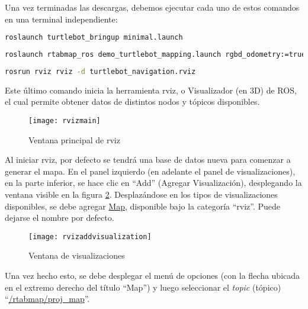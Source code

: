 Una vez terminadas las descargas, debemos ejecutar cada uno de estos comandos en una terminal independiente:

\begin{blackcodebox}
\begin{lstlisting}[language=bash]
roslaunch turtlebot_bringup minimal.launch
\end{lstlisting}
\end{blackcodebox}

\begin{blackcodebox}
\begin{lstlisting}[language=bash]
roslaunch rtabmap_ros demo_turtlebot_mapping.launch rgbd_odometry:=true args:="--delete_db_on_start"
\end{lstlisting}
\end{blackcodebox}

\begin{blackcodebox}
\begin{lstlisting}[language=bash]
rosrun rviz rviz -d turtlebot_navigation.rviz
\end{lstlisting}
\end{blackcodebox}

Este último comando inicia la herramienta rviz, o Visualizador (en 3D) de ROS, el cual permite obtener datos de distintos nodos y tópicos disponibles.

\begin{figure}[h]
\centering
\texttt{[image: rvizmain]}
\caption{Ventana principal de rviz}
\label{figure:rvizmain}
\end{figure}

Al iniciar rviz, por defecto se tendrá una base de datos nueva para comenzar a generar el mapa. En el panel izquierdo (en adelante el panel de visualizaciones), en la parte inferior, se hace clic en ``Add'' (Agregar Visualización), desplegando la ventana visible en la figura \ref{figure:rvizaddvisualization}. Desplazándose en los tipos de visualizaciones disponibles, se debe agregar \url{Map}, disponible bajo la categoría ``rviz''. Puede dejarse el nombre por defecto.

\begin{figure}[H]
\centering
\texttt{[image: rvizaddvisualization]}
\caption{Ventana de visualizaciones}
\label{figure:rvizaddvisualization}
\end{figure}

Una vez hecho esto, se debe desplegar el menú de opciones (con la flecha ubicada en el extremo derecho del título ``Map'') y luego seleccionar el \textit{topic} (tópico) ``\url{/rtabmap/proj_map}''.

